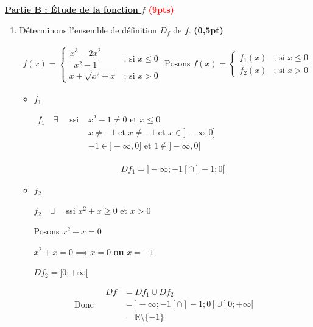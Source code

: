 \documentclass[12pt,a4paper]{article}
\begin{document}
\underline{\textbf{Partie B : Étude de la fonction $f$}} \textcolor{red}{\textbf{(9pts)}}
\begin{enumerate}
    \item Déterminons l'ensemble de définition $D_f$ de $f$. \textbf{(0,5pt)}

$$
\begin{aligned}
f(x) =
\begin{cases}
\dfrac{x^3 - 2x^2}{x^2 - 1} & \text{; si } x \leq 0 \\
x + \sqrt{x^2 + x} & \text{; si } x > 0
\end{cases} \text{ Posons }
f(x) =
\begin{cases}
f_{1}(x) & \text{; si } x \leq 0 \\
f_{2}(x) & \text{; si } x > 0
\end{cases}
\end{aligned}
$$    

\begin{itemize}
\item $f_{1}$

$
\begin{aligned}
f_{1} \quad \exists \quad \text{ ssi } & x^2 - 1 \neq 0 \text{ et } x \leq 0\\
												 & x \neq -1 \text{ et } x \neq -1 \text{ et } x \in ]-\infty,0] \\
												 & -1 \in ]-\infty,0] \text{ et }  1  \notin ]-\infty,0] \\
\end{aligned}
$	

$$\underline{Df_{1} = ]-\infty ; -1[ \cap ]-1 ; 0[}$$

\item $f_{2}$

$ f_{2} \quad \exists \quad$ ssi  $x^2 + x \geq 0 $ et $x > 0$

Posons $x^2 + x = 0 $

$x^2 + x = 0  \implies x=0 \textbf{ ou } x=-1$       
   
    
    \underline{$Df_{2} = ]0 ; +\infty[$}  
\end{itemize}

$$ \text{Donc}\quad
\begin{aligned}
Df & = Df_{1} \cup Df_{2} \\
    & = ]-\infty ; -1[ \cap ]-1 ; 0[ \cup ]0 ; +\infty[\\
    &=\mathbb{R}\setminus \{-1\}
\end{aligned}
$$
    

\end{enumerate}
\end{document}
